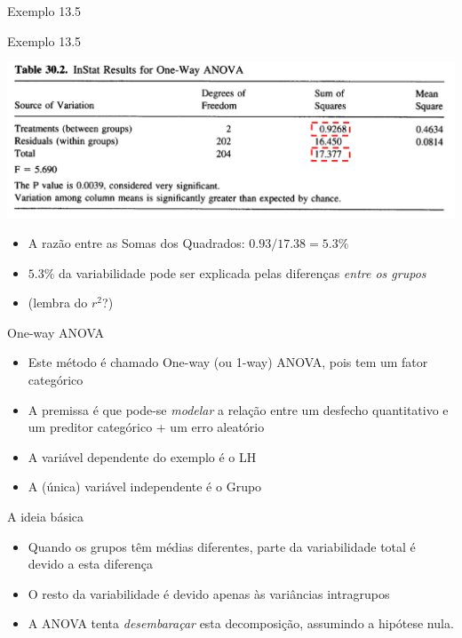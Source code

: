 \documentclass{beamer}
\begin{document}
\begin{frame}{\small Exemplo 13.5}
  \begin{exampleblock}{Exemplo 13.5}
    \begin{center}
      \includegraphics[width=.8\textwidth]{Cap13-30/exemplo13_5-2}
    \end{center}
    \bigskip
    \begin{itemize}
      \scriptsize
    \item A razão entre as Somas dos Quadrados: $0.93/17.38 = 5.3\%$
    \item $5.3\%$ da variabilidade pode ser explicada pelas diferenças {\em entre os grupos}
    \item (lembra do $r^2$?)
    \end{itemize}
  \end{exampleblock}
\end{frame}

\begin{frame}{One-way ANOVA}
  \begin{itemize}
    \small
  \item Este método é chamado One-way (ou 1-way) ANOVA, pois tem um fator categórico
    \bigskip
  \item A premissa é que pode-se {\em modelar} a relação entre um desfecho quantitativo e um preditor categórico + um erro aleatório
    \bigskip
    \bigskip
  \item A variável dependente do exemplo é o LH
  \item A (única) variável independente é o Grupo
  \end{itemize}
\end{frame}

\begin{frame}{A ideia básica}
  \begin{itemize}
    \footnotesize
  \item Quando os grupos têm médias diferentes, parte da variabilidade total é devido a esta diferença
  \item O resto da variabilidade é devido apenas às variâncias intragrupos
    \bigskip
    \bigskip
  \item A ANOVA tenta {\em desembaraçar} esta decomposição, assumindo a hipótese nula.
  \end{itemize}
\end{frame}
\end{document}
